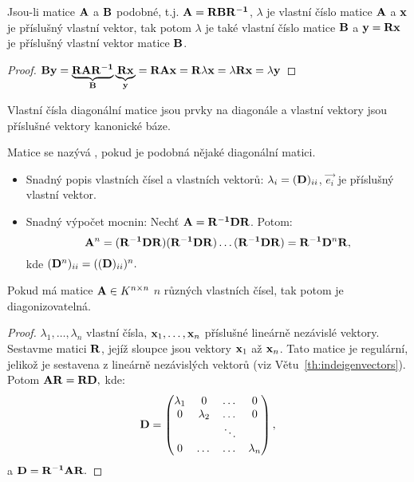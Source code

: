 \begin{theorem}
    Jsou-li matice $\mathbf{A}$ a $\mathbf{B}$ podobné, t.j. $\mathbf{A} = \mathbf{R} \mathbf{B} \mathbf{R^{-1}}$, 
    $\lambda$ je vlastní číslo
    matice $\mathbf{A}$ a $\mathbf{x}$ je příslušný vlastní vektor, tak potom $\lambda$
    je také vlastní číslo matice $\mathbf{B}$ a $\mathbf{y} = \mathbf{R} \mathbf{x}$ je příslušný
    vlastní vektor matice $\mathbf{B}$.
\end{theorem}

\begin{proof}
    $\mathbf{B}\mathbf{y} = \underbrace{\mathbf{R} \mathbf{A} \mathbf{R^{-1}}}_{\mathbf{B}} \underbrace{\mathbf{R} \mathbf{x}}_{\mathbf{y}} = 
    \mathbf{R} \mathbf{A} \mathbf{x} = \mathbf{R} \lambda \mathbf{x} = \lambda \mathbf{R} \mathbf{x} = \lambda \mathbf{y}$
\end{proof}

\begin{observation}
    Vlastní čísla diagonální matice jsou prvky na diagonále a vlastní 
    vektory jsou příslušné vektory kanonické báze.
\end{observation}

\begin{definition}
    Matice se nazývá , pokud je podobná
    nějaké diagonální matici.
\end{definition}

\begin{remark}
    \leavevmode
    \begin{itemize}
        \item Snadný popis vlastních čísel a vlastních vektorů: $\lambda_i
            = (\mathbf{D})_{ii}$, $\vec{e_i}$ je příslušný vlastní vektor.
        \item Snadný výpočet mocnin: Nechť $\mathbf{A} = \mathbf{R^{-1}} \mathbf{D} \mathbf{R}$. Potom:
            $$ \mathbf{A}^n = (\mathbf{R^{-1}} \mathbf{D} \mathbf{R}) (\mathbf{R^{-1}} \mathbf{D} \mathbf{R}) \dots (\mathbf{R^{-1}} \mathbf{D} \mathbf{R})
            = \mathbf{R^{-1}} \mathbf{D}^n \mathbf{R},$$
            kde $(\mathbf{D}^n)_{ii} = ((\mathbf{D})_{ii})^n.$
    \end{itemize}
\end{remark}

\begin{theorem}
    Pokud má matice $\mathbf{A} \in K^{n \times n}$ $n$ různých vlastních čísel, tak potom
    je diagonizovatelná.
\end{theorem}

\begin{proof}
    $\lambda_1, \dots, \lambda_n$ vlastní čísla, $\mathbf{x}_1, \dots, \mathbf{x}_n$
    příslušné lineárně nezávislé vektory. Sestavme matici $\mathbf{R}$, jejíž
    sloupce jsou vektory $\mathbf{x}_1$ až $\mathbf{x}_n$. Tato matice je regulární,
    jelikož je sestavena z lineárně nezávislých vektorů 
    (viz Větu~\ref{th:indeigenvectors}). Potom $\mathbf{A}\mathbf{R} = \mathbf{R} \mathbf{D},$
    kde:
    $$\mathbf{D} = \begin{pmatrix}
        \lambda_1 &0         &\dots  &0 \\
                0 &\lambda_2 &\dots  &0 \\
                  &          &\ddots  &  \\
                0 &\dots     &\dots  &\lambda_n
    \end{pmatrix},$$
    a $\mathbf{D} = \mathbf{R^{-1}} \mathbf{A} \mathbf{R}.$
\end{proof}

